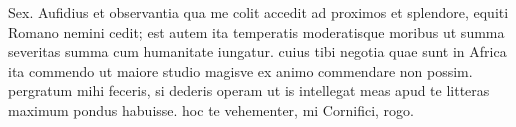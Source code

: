 


Sex. Aufidius et observantia qua me colit accedit ad proximos et splendore, equiti Romano nemini cedit; est autem ita temperatis moderatisque moribus ut summa severitas summa cum humanitate iungatur. cuius tibi negotia quae sunt in Africa ita commendo ut maiore studio magisve ex animo commendare non possim. pergratum mihi feceris, si dederis operam ut is intellegat meas apud te litteras maximum pondus habuisse. hoc te vehementer, mi Cornifici, rogo.

